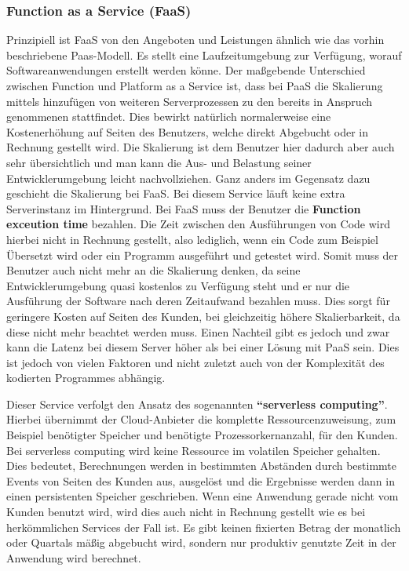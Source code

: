 \subsubsection{Function as a Service (FaaS)}
Prinzipiell ist FaaS von den Angeboten und Leistungen ähnlich wie das vorhin beschriebene Paas-Modell. Es stellt eine Laufzeitumgebung zur Verfügung, worauf Softwareanwendungen erstellt werden könne. Der maßgebende Unterschied zwischen Function und Platform as a Service ist, dass bei PaaS die Skalierung mittels hinzufügen von weiteren Serverprozessen zu den bereits in Anspruch genommenen stattfindet. Dies bewirkt natürlich normalerweise eine Kostenerhöhung auf Seiten des Benutzers, welche direkt Abgebucht oder in Rechnung gestellt wird. Die Skalierung ist dem Benutzer hier dadurch aber auch sehr übersichtlich und man kann die Aus- und Belastung seiner Entwicklerumgebung leicht nachvollziehen.\newline
Ganz anders im Gegensatz dazu geschieht die Skalierung bei FaaS. Bei diesem Service läuft keine extra Serverinstanz im Hintergrund. Bei FaaS muss der Benutzer die \textbf{Function exceution time} bezahlen. Die Zeit zwischen den Ausführungen von Code wird hierbei nicht in Rechnung gestellt, also lediglich, wenn ein Code zum Beispiel Übersetzt wird oder ein Programm ausgeführt und getestet wird. Somit muss der Benutzer auch nicht mehr an die Skalierung denken, da seine Entwicklerumgebung quasi kostenlos zu Verfügung steht und er nur die Ausführung der Software nach deren Zeitaufwand bezahlen muss. Dies sorgt für geringere Kosten auf Seiten des Kunden, bei gleichzeitig höhere Skalierbarkeit, da diese nicht mehr beachtet werden muss. Einen Nachteil gibt es jedoch und zwar kann die Latenz bei diesem Server höher als bei einer Lösung mit PaaS sein. Dies ist jedoch von vielen Faktoren und nicht zuletzt auch von der Komplexität des kodierten Programmes abhängig.

Dieser Service verfolgt den Ansatz des sogenannten \textbf{"`serverless computing"'}. Hierbei übernimmt der Cloud-Anbieter die komplette Ressourcenzuweisung, zum Beispiel benötigter Speicher und benötigte Prozessorkernanzahl, für den Kunden. Bei serverless computing wird keine Ressource im volatilen Speicher gehalten. Dies bedeutet, Berechnungen werden in bestimmten Abständen durch bestimmte Events von Seiten des Kunden aus, ausgelöst und die Ergebnisse werden dann in einen persistenten Speicher geschrieben. Wenn eine Anwendung gerade nicht vom Kunden benutzt wird, wird dies auch nicht in Rechnung gestellt wie es bei herkömmlichen Services der Fall ist. Es gibt keinen fixierten Betrag der monatlich oder Quartals mäßig abgebucht wird, sondern nur produktiv genutzte Zeit in der Anwendung wird berechnet.

